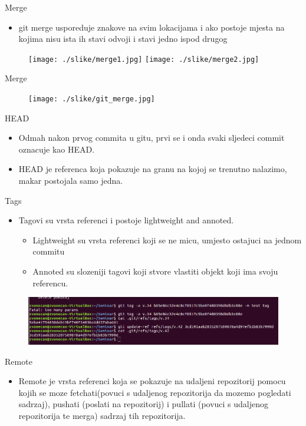 \documentclass[]{beamer}
\begin{document}
\begin{frame}{Merge}
\begin{itemize}
	\item git merge usporeduje znakove na svim lokacijama i ako postoje mjesta na kojima nisu ista ih stavi odvoji i stavi jedno ispod drugog
\end{itemize}
\begin{figure}
		\centering
	\texttt{[image: ./slike/merge1.jpg]}
	\texttt{[image: ./slike/merge2.jpg]}
	\end{figure}
\end{frame}

\begin{frame}{Merge}
\begin{figure}
		\centering
	\texttt{[image: ./slike/git\_merge.jpg]}
	\end{figure}
\end{frame}

\begin{frame}{HEAD}
	\begin{itemize}
	\item Odmah nakon prvog commita u gitu, prvi se i onda svaki sljedeci commit oznacuje kao HEAD.
	\item HEAD je referenca koja pokazuje na granu na kojoj se trenutno nalazimo, makar postojala samo jedna.
	\end{itemize}
\end{frame}
\begin{frame}{Tags}
	\begin{itemize}
	\item Tagovi su vrsta referenci i postoje lightweight and annoted.
	\begin{itemize}
	\item Lightweight su vrsta referenci koji se ne micu, umjesto ostajuci na jednom commitu
	\item Annoted su slozeniji tagovi koji stvore vlastiti objekt koji ima svoju referencu.
	\end{itemize}
	\end{itemize}
\end{frame}
\begin{frame}
	\begin{figure}
	\includegraphics[width=1\textwidth]{./slike/tag.png}
	\end{figure}
\end{frame}
\begin{frame}{Remote}
	\begin{itemize}
	\item Remote je vrsta referenci koja se pokazuje na udaljeni repozitorij pomocu kojih se moze fetchati(povuci s udaljenog repozitorija da mozemo pogledati sadrzaj), pushati (poslati na repozitorij) i pullati (povuci s udaljenog repozitorija te merga) sadrzaj tih repozitorija.  
	\end{itemize}
\end{frame}
\end{document}
